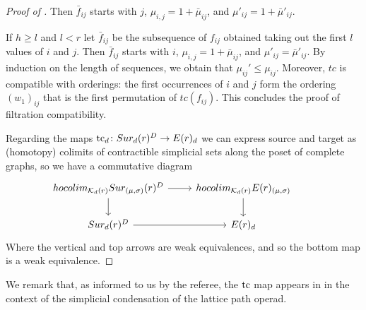 \begin{proof}[Proof of ]
	Then $\bar{f}_{ij}$ starts with $j$, $\mu_{i,j}=1+\bar{\mu}_{ij}$, and $\mu'_{ij}=1+\bar{\mu}'_{ij}$.

	If $h \geq l$ and $l<r$ let $\bar{f}_{ij}$ be the subsequence of $f_{ij}$ obtained taking out the first $l$ values of $i$ and $j$.
	Then $\bar{f}_{ij}$	starts with $i$, $\mu_{i,j}=1+\bar{\mu}_{ij}$, and $\mu'_{ij}=\bar{\mu}'_{ij}$.
	By induction on the length of sequences, we obtain that $\mu_{ij}'\le \mu_{ij}$.
	Moreover, $tc$ is compatible with orderings: the first occurrences of $i$ and $j$ form the ordering $(w_1)_{ij}$ that is the first permutation of $tc(f_{ij})$.
	This concludes the proof of filtration compatibility.

	Regarding the maps $\operatorname{tc}_{d} \colon Sur_{d}(r)^{D}\rightarrow E(r)_{d}$ we can express source and target as (homotopy) colimits of contractible simplicial sets along the poset of complete graphs,	so we have a commutative diagram
	\begin{equation*}
		\begin{tikzcd}
			hocolim_{\CG_d(r)}\sur_{(\mu,\sigma)}(r)^{D} \arrow[r] \arrow[d]&
			hocolim_{\CG_d(r)}\BE(r)_{(\mu,\sigma)} \arrow[d] \\
			\sur_{d}(r)^{D}\arrow[r] & \BE(r)_{d}&
		\end{tikzcd}
	\end{equation*}
	Where the vertical and top arrows are weak equivalences, and so the bottom map is a weak equivalence.
\end{proof}

We remark that, as informed to us by the referee, the $\operatorname{tc}$ map appears in \cite[Example~3.10(b)]{batanin2009lattice} in the context of the simplicial condensation of the lattice path operad.